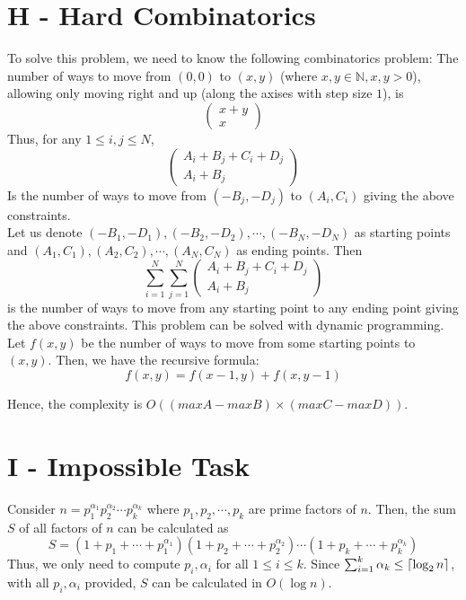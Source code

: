 \documentclass{article}
\DeclarePairedDelimiter\ceil{\lceil}{\rceil}
\begin{document}
\section*{H - Hard Combinatorics}
To solve this problem, we need to know the following combinatorics problem: The number of ways to move from $(0, 0)$ to $(x, y)$ (where $x, y \in \mathbb{N}, x, y > 0$), 
allowing only moving right and up (along the axises with
step size $1$), is
\begin{equation}
\begin{pmatrix}
x + y\\
x
\end{pmatrix}
\end{equation}
Thus, for any $1 \leq i, j \leq N$,
\begin{equation}
\begin{pmatrix}
A_i + B_j + C_i + D_j\\
A_i + B_j
\end{pmatrix}
\end{equation}
Is the number of ways to move from $(-B_j, -D_j)$ to $(A_i, C_i)$ giving the above constraints.\\

\noindent Let us denote $(-B_1, -D_1), (-B_2, -D_2), \cdots, (-B_N, -D_N)$ as starting points and $(A_1, C_1), (A_2, C_2), \cdots, (A_N, C_N)$ as ending points. Then
\begin{equation}
\sum_{i = 1}^N\sum_{j = 1}^N\begin{pmatrix}
A_i + B_j + C_i + D_j\\
A_i + B_j
\end{pmatrix}
\end{equation}
is the number of ways to move from any starting point to any ending point giving the above constraints. This problem can be solved with dynamic programming. Let
$f(x, y)$ be the number of ways to move from some starting points to $(x, y)$. Then, we have the recursive formula:
\begin{equation}
f(x, y) = f(x - 1, y) + f(x, y - 1)
\end{equation}

\noindent Hence, the complexity is $O((maxA - maxB) \times (maxC - maxD))$.

\section*{I - Impossible Task}
Consider $n = p_1^{\alpha_1}p_2^{\alpha_2}\cdots p_k^{\alpha_k}$ where $p_1, p_2, \cdots, p_k$ are prime factors of $n$.
Then, the sum $S$ of all factors of $n$ can be calculated as
\begin{equation}
S = \left(1 + p_1 + \cdots + p_1^{\alpha_1}\right)\left(1 + p_2 + \cdots + p_2^{\alpha_2}\right)\cdots\left(1 + p_k + \cdots + p_k^{\alpha_k}\right)
\end{equation}
Thus, we only need to compute $p_i, \alpha_i$ for all $1 \leq i \leq k$. Since $\sum_{i = 1}^k \alpha_k \leq \ceil{\log_2{n}}$, with
all $p_i, \alpha_i$ provided, $S$ can be calculated in $O(\log{n})$.\\
\end{document}
